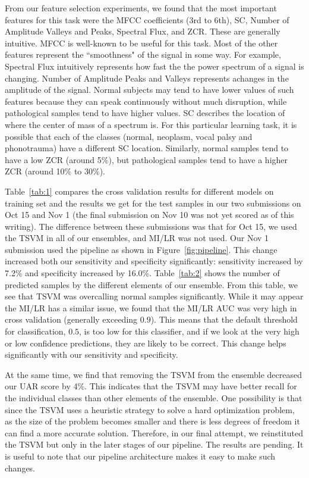 From our feature selection experiments, we found that the most important features for this task were the MFCC coefficients (3rd to 6th), SC, Number of Amplitude Valleys and Peaks, Spectral Flux, and ZCR. These are generally intuitive. MFCC is well-known to be useful for this task. Most of the other features represent the ``smoothness" of the signal in some way. For example, Spectral Flux intuitively represents how fast the the power spectrum of a signal is changing. Number of Amplitude Peaks and Valleys represents achanges in the amplitude of the signal. Normal subjects may tend to have lower values of such features because they can speak continuously without much disruption, while pathological samples tend to have higher values. SC describes the location of where the center of mass of a spectrum is. For this particular learning task, it is possible that each of the classes (normal, neoplasm, vocal palsy and phonotrauma) have a different SC location. Similarly,  normal samples tend to have a low ZCR (around 5\%), but pathological samples tend to have a higher ZCR (around 10\% to 30\%).

Table~\ref{tab:1} compares the cross validation results for different models on training set and the results we get for the test samples in our two submissions on Oct 15 and Nov 1 (the final submission on Nov 10 was not yet scored as of this writing). The difference between these submissions was that for Oct 15, we used the TSVM in all of our ensembles, and MI/LR was not used. Our Nov 1 submission used the pipeline as shown in Figure~\ref{fig:pipeline}. This change increased both our sensitivity and specificity significantly: sensitivity increased by 7.2\% and specificity increased by 16.0\%.  Table~\ref{tab:2} shows the number of predicted samples by the different elements of our ensemble. From this table, we see that TSVM was overcalling normal samples significantly. While it may appear the MI/LR has a similar issue, we found that the MI/LR AUC was very high in cross validation (generally exceeding $0.9$). This means that the default threshold for classification, $0.5$, is too low for this classifier, and if we look at the very high or low confidence predictions, they are likely to be correct. This change helps significantly with our sensitivity and specificity.

At the same time, we find that removing the TSVM from the ensemble decreased our UAR score by 4\%. This indicates that the TSVM may have better recall for the individual classes than other elements of the ensemble. One possibility is that since the TSVM uses a heuristic strategy to solve a hard optimization problem, as the size of the problem becomes smaller and there is less degrees of freedom it can find a more accurate solution. Therefore, in our final attempt, we reinstituted the TSVM but only in the later stages of our pipeline. The results are pending. It is useful to note that our pipeline architecture makes it easy to make such changes.

